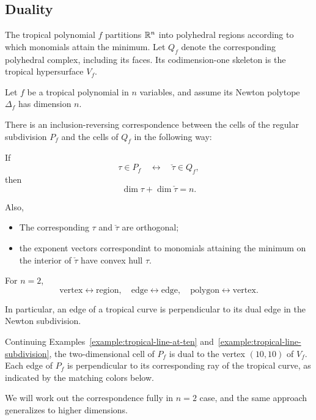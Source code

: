 \documentclass[../../main.tex]{subfiles}
\begin{document}
\subsection{Duality}

The tropical polynomial $f$ partitions $\mathbb{R}^n$ into polyhedral regions according to which monomials attain the minimum. Let $Q_f$ denote the corresponding polyhedral complex, including its faces. Its codimension-one skeleton is the tropical hypersurface $V_f$.

\begin{thm}
    Let $f$ be a tropical polynomial in $n$ variables, and assume its Newton polytope $\Delta_f$ has dimension $n$. 

    There is an inclusion-reversing correspondence between the cells of the regular subdivision $P_f$ and the cells of $Q_f$ in the following way:

    If
    \[\tau \in P_f \quad \longleftrightarrow \quad \check\tau \in Q_f,\]
    then
    \[\dim \tau + \dim \check\tau = n.\]

    Also,
    \begin{itemize}
        \item The corresponding $\tau$ and $\check\tau$ are orthogonal;
        \item the exponent vectors correspondint to monomials attaining the minimum on the interior of $\check\tau$ have convex hull $\tau$.
    \end{itemize}

    For $n=2$, 
    \[\text{vertex} \longleftrightarrow \text{region},\quad \text{edge}\longleftrightarrow \text{edge},\quad \text{polygon}\longleftrightarrow\text{vertex}.\]

    In particular, an edge of a tropical curve is perpendicular to its dual edge in the Newton subdivision.
\end{thm}

\begin{example}
    Continuing Examples~\ref{example:tropical-line-at-ten} and~\ref{example:tropical-line-subdivision}, the two-dimensional cell of $P_f$ is dual to the vertex $(10,10)$ of $V_f$. Each edge of $P_f$ is perpendicular to its corresponding ray of the tropical curve, as indicated by the matching colors below.

    \TropicalDualityFigure
\end{example}

We will work out the correspondence fully in $n=2$ case, and the same approach generalizes to higher dimensions.
\end{document}
